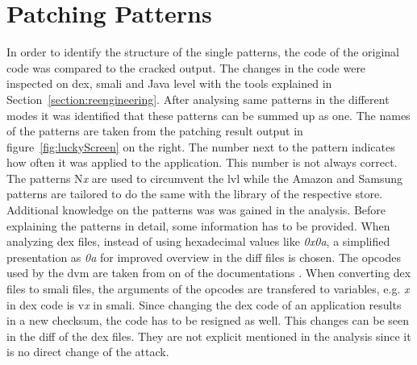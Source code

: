 \section{Patching Patterns} \label{section:luckypatcher-patterns}
In order to identify the structure of the single patterns, the code of the original code was compared to the cracked output.
The changes in the code were inspected on dex, smali and Java level with the tools explained in Section~\ref{section:reengineering}.
After analysing same patterns in the different modes it was identified that these patterns can be summed up as one.
\newline
The names of the patterns are taken from the patching result output in figure~\ref{fig:luckyScreen} on the right.
The number next to the pattern indicates how often it was applied to the application.
This number is not always correct.
The patterns N\textit{x} are used to circumvent the \gls{lvl} while the Amazon and Samsung patterns are tailored to do the same with the library of the respective store.
Additional knowledge on the patterns was was gained in the analysis.
\newline
Before explaining the patterns in detail, some information has to be provided.
When analyzing \gls{dex} files, instead of using hexadecimal values like \textit{0x0a}, a simplified presentation as \textit{0a} for improved overview in the diff files is chosen.
The opcodes used by the \gls{dvm} are taken from on of the documentations \cite{opcodes}.
When converting \gls{dex} files to smali files, the arguments of the opcodes are transfered to variables, e.g. \textit{x} in dex code is v\textit{x} in smali.
\newline
Since changing the dex code of an application results in a new checksum, the code has to be resigned as well.
This changes can be seen in the diff of the dex files.
They are not explicit mentioned in the analysis since it is no direct change of the attack.

